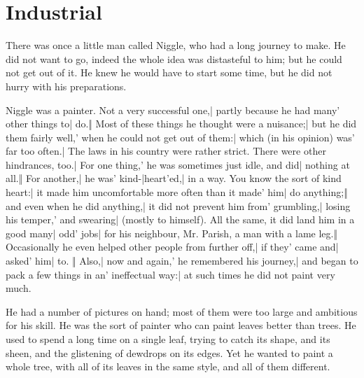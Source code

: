 \section*{Industrial}

There was once a little man called Niggle, who had a long journey to make. He did not want to go, indeed the whole idea was distasteful to him; but he could not get out of it. He knew he would have to start some time, but he did not hurry with his preparations.


\begin{itemize}
\nochant Niggle was a painter.
\halfone Not a very successful one,| partly because he had many' other things to| do.‖ Most of these things he thought were a nuisance;| but he did them fairly well,' when he could not get out of them:| which (in his opinion) was' far too often.| The laws in his country were rather strict.
\halftwo There were other hindrances, too.| For one thing,' he was sometimes just idle, and did| nothing at all.‖ For another,| he was' kind-|heart'ed,| in a way.
\halfone You know the sort of kind heart:| it made him uncomfortable more often than it made' him| do anything;‖ and even when he did anything,| it did not prevent him from' grumbling,| losing his temper,' and swearing| (mostly to himself).
\halftwo All the same, it did land him in a good many| odd' jobs| for his neighbour, Mr. Parish, a man with a lame leg.‖ Occasionally he even helped other people from further off,| if they' came and| asked' him| to.
\quarterfour ‖ Also,| now and again,' he remembered his journey,| and began to pack a few things in an' ineffectual way:| at such times he did not paint very much.
\end{itemize}

He had a number of pictures on hand; most of them were too large and ambitious for his skill. He was the sort of painter who can paint leaves better than trees. He used to spend a long time on a single leaf, trying to catch its shape, and its sheen, and the glistening of dewdrops on its edges. Yet he wanted to paint a whole tree, with all of its leaves in the same style, and all of them different.


